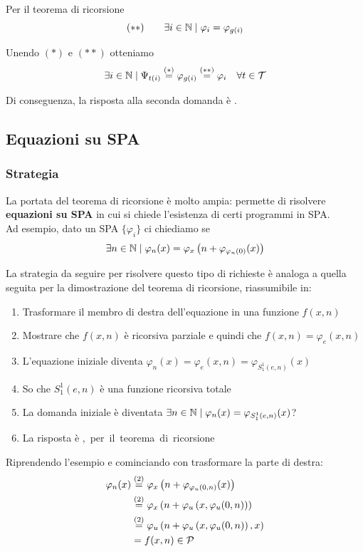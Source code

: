 Per il teorema di ricorsione
$$ (\ast \ast) \quad \quad \exists i \in \mathbb{N} \mid \varphi_i = \varphi_{g(i)} $$

Unendo $(\ast)$ e $(\ast \ast)$ otteniamo 
$$ \exists i \in \mathbb{N} \mid \Psi_{t(i)} \stackrel{(\ast)}{=} \varphi_{g(i)} \stackrel{(\ast \ast)}{=} \varphi_i \quad \forall t \in \mathcal{T} $$

Di conseguenza, la risposta alla seconda domanda è \no.\\

\subsection{Equazioni su SPA}
\subsubsection{Strategia}

La portata del teorema di ricorsione è molto ampia: permette di risolvere \textbf{equazioni su SPA} in cui si chiede l'esistenza di certi programmi in SPA.\\

Ad esempio, dato un SPA $\{\varphi_i\}$ ci chiediamo se
$$ \exists n \in \mathbb{N} \mid \varphi_n (x) = \varphi_x \left(n + \varphi_{\varphi_n (0)} (x) \right) $$

La strategia da seguire per risolvere questo tipo di richieste è analoga a quella seguita per la dimostrazione del teorema di ricorsione, riassumibile in: 
\begin{enumerate}
	\item Trasformare il membro di destra dell'equazione in una funzione $f(x,n)$
	\item Mostrare che $f(x,n)$ è ricorsiva parziale e quindi che $f(x,n) = \varphi_e (x,n)$
	\item L'equazione iniziale diventa $\varphi_n (x) = \varphi_e (x, n) = \varphi_{S^1_1 (e,n)} (x)$
	\item So che $S^1_1 (e,n)$ è una funzione ricorsiva totale
	\item La domanda iniziale è diventata $\exists n \in \mathbb{N} \mid \varphi_n (x) = \varphi_{S_1^1 (e,n)} (x)$? 
	\item La risposta è \si, per il teorema di ricorsione
\end{enumerate}

Riprendendo l'esempio e cominciando con trasformare la parte di destra:
\begin{align*}
	\varphi_n (x) & \stackrel{(2)}{=} \varphi_x \left(n + \varphi_{\varphi_u (0,n)} (x)\right) \\
	& \stackrel{(2)}{=} \varphi_x \left(n + \varphi_u \left(x, \varphi_u (0,n)\right)\right) \\
	& \stackrel{(2)}{=} \varphi_u \left(n + \varphi_u \left(x, \varphi_u (0,n)\right), x\right) \\
	& = f(x,n) \in \mathcal{P} 
\end{align*}

